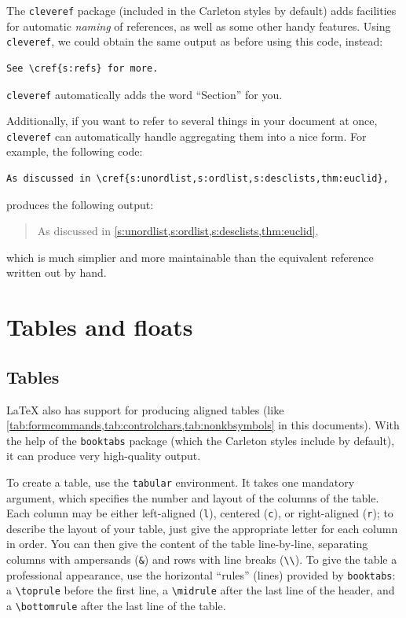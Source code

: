 \documentclass{article}
\newcommand*{\code}[1]{\texttt{#1}}
\begin{document}
The \code{cleveref} package (included in the Carleton styles by default) adds facilities for automatic \emph{naming} of references, as well as some other handy features.
Using \code{cleveref}, we could obtain the same output as before using this code, instead:
\begin{verbatim}
See \cref{s:refs} for more.
\end{verbatim}
\code{cleveref} automatically adds the word \enquote{Section} for you.

Additionally, if you want to refer to several things in your document at once, \code{cleveref} can automatically handle aggregating them into a nice form.
For example, the following code:
\begin{verbatim}
As discussed in \cref{s:unordlist,s:ordlist,s:desclists,thm:euclid},
\end{verbatim}
produces the following output:
\begin{quote}
  As discussed in \cref{s:unordlist,s:ordlist,s:desclists,thm:euclid},
\end{quote}
which is much simplier and more maintainable than the equivalent reference written out by hand.

\section{Tables and floats}
\label{s:tablesandfloats}
\subsection{Tables}
\label{s:tables}
\LaTeX{} also has support for producing aligned tables (like \cref{tab:formcommands,tab:controlchars,tab:nonkbsymbols} in this documents).
With the help of the \code{booktabs} package (which the Carleton styles include by default), it can produce very high-quality output.

To create a table, use the \code{tabular} environment.
It takes one mandatory argument, which specifies the number and layout of the columns of the table.
Each column may be either left-aligned (\code{l}), centered (\code{c}), or right-aligned (\code{r}); to describe the layout of your table, just give the appropriate letter for each column in order.
You can then give the content of the table line-by-line, separating columns with ampersands (\code{\&}) and rows with line breaks (\code{\textbackslash{}\textbackslash{}}).
To give the table a professional appearance, use the horizontal \enquote{rules} (lines) provided by \code{booktabs}: a \code{\textbackslash{}toprule} before the first line, a \code{\textbackslash{}midrule} after the last line of the header, and a \code{\textbackslash{}bottomrule} after the last line of the table.
\end{document}
